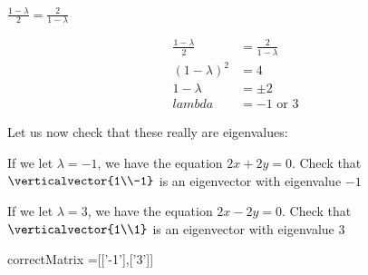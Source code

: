 \documentclass{ximera}
\begin{document}
\begin{question}
\begin{solution}
\begin{hint}
      \(
      \frac{1-\lambda}{2} = \frac{2}{1-\lambda}
      \)
    \end{hint}
    \begin{hint}
      \begin{align*}
        \frac{1-\lambda}{2} &= \frac{2}{1-\lambda}\\
        (1-\lambda)^2 &= 4\\
        1-\lambda &= \pm 2\\
        lambda &= -1 \text{ or } 3
      \end{align*}
    \end{hint}
    \begin{hint}
      Let us now check that these really are eigenvalues:
      
      If we let $\lambda = -1$, we have the equation $2x+2y=0$.  Check that $\verticalvector{1\\-1}$ is an eigenvector with eigenvalue $-1$
      
      If we let $\lambda = 3$, we have the equation $2x-2y=0$.  Check that $\verticalvector{1\\1}$ is an eigenvector with eigenvalue $3$
      
    \end{hint}
    
    \begin{matrix-answer}
      correctMatrix =[['-1'],['3']]
    \end{matrix-answer}
  \end{solution}
\end{question}
\end{document}
